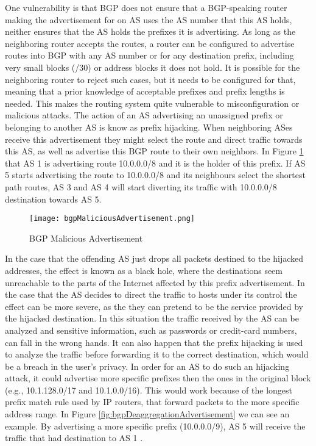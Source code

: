 \documentclass[11pt]{report}
\begin{document}
One vulnerability is that BGP does not ensure that a BGP-speaking router making the advertisement for on AS uses the AS number that this AS holds, neither ensures that the AS holds the prefixes it is advertising. As long as the neighboring router accepts the routes, a router can be configured to advertise routes into BGP with any AS number or for any destination prefix, including very small blocks (/30) or address blocks it does not hold. It is possible for the neighboring router to reject such cases, but it needs to be configured for that, meaning that a prior knowledge of acceptable prefixes and prefix lengths is needed. This makes the routing system quite vulnerable to misconfiguration or malicious attacks. The action of an AS advertising an unassigned prefix or belonging to another AS is know as prefix hijacking. When neighboring ASes receive this advertisement they might select the route and direct traffic towards this AS, as well as advertise this BGP route to their own neighbors. In Figure \ref{fig:bgpMaliciousAdvertisement} that AS 1 is advertising route 10.0.0.0/8 and it is the holder of this prefix. If AS 5 starts advertising the route to 10.0.0.0/8 and its neighbours select the shortest path routes, AS 3 and AS 4 will start diverting its traffic with 10.0.0.0/8 destination towards AS 5.

\begin{figure}[h!]
\centering
\texttt{[image: bgpMaliciousAdvertisement.png]}
\caption{BGP Malicious Advertisement}
\label{fig:bgpMaliciousAdvertisement}
\end{figure}

In the case that the offending AS just drops all packets destined to the hijacked addresses, the effect is known as a black hole, where the destinations seem unreachable to the parts of the Internet affected by this prefix advertisement. In the case that the AS decides to direct the traffic to hosts under its control the effect can be more severe, as the they can pretend to be the service provided by the hijacked destination. In this situation the traffic received by the AS can be analyzed and sensitive information, such as passwords or credit-card numbers, can fall in the wrong hands. It can also happen that the prefix hijacking is used to analyze the traffic before forwarding it to the correct destination, which would be a breach in the user's privacy. In order for an AS to do such an hijacking attack, it could advertise more specific prefixes then the ones in the original block (e.g., 10.1.128.0/17 and 10.1.0.0/16). This would work because of the longest prefix match rule used by IP routers, that forward packets to the more specific address range. In Figure \ref{fig:bgpDeaggregationAdvertisement} we can see an example. By advertising a more specific prefix (10.0.0.0/9), AS 5 will receive the traffic that had destination to AS 1 .
\end{document}
